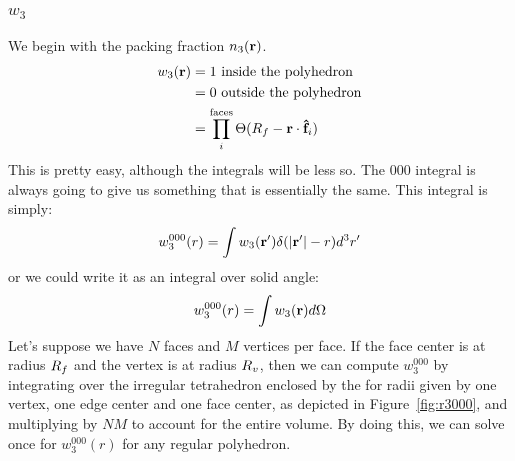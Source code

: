 \documentclass[letterpaper,twocolumn,amsmath,amssymb,pre]{revtex4-1}
\begin{document}
\subsubsection{$w_3$}
We begin with the packing fraction $n_3(\mathbf{r})$.
\begin{align}
  w_3(\mathbf{r}) &= 1 \text{ inside the polyhedron}\\
  &= 0 \text{ outside the polyhedron} \\
  &= \prod_i^{\text{faces}} \Theta(R_f - \mathbf{r}\cdot\mathbf{\hat{f}}_i)
\end{align}
This is pretty easy, although the integrals will be less so.  The
$000$ integral is always going to give us something that is
essentially the same.  This integral is simply:
\begin{align}
  w_3^{000}(r) = \int w_3(\mathbf{r}') \delta(|\mathbf{r}'|-r) d^3r'\label{eq:w3000}
\end{align}
or we could write it as an integral over solid angle:
\begin{align}
  w_3^{000}(r) = \int w_3(\mathbf{r}) d\Omega
\end{align}
Let's suppose we have $N$ faces and $M$ vertices per face.  If the
face center is at radius $R_f$ and the vertex is at radius $R_v$, then
we can compute $w_3^{000}$ by integrating over the irregular
tetrahedron enclosed by the for radii given by one vertex, one edge
center and one face center, as depicted in Figure~\ref{fig:r3000}, and
multiplying by $NM$ to account for the entire volume.  By doing this,
we can solve once for $w_3^{000}(r)$ for any regular polyhedron.
\end{document}
